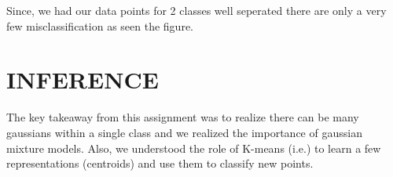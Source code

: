 \documentclass[11pt,a4paper]{article}
\begin{document}
Since, we had our data points for 2 classes well seperated there are only a very few misclassification as seen the figure.

\section*{INFERENCE}

The key takeaway from this assignment was to realize there can be many gaussians within a single class and we realized the importance of gaussian mixture models. Also, we understood the role of K-means (i.e.) to learn a few representations (centroids) and use them to classify new points.
\end{document}
